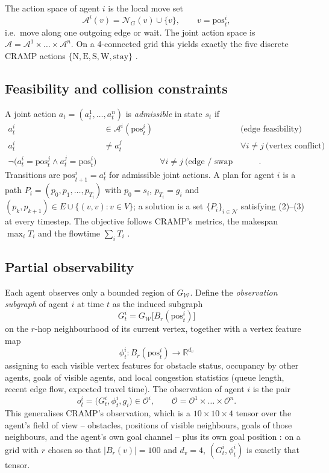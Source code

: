 \documentclass[../main.tex]{subfiles}
\begin{document}
The action space of agent $i$ is the local move set
\[
  \mathcal{A}^i(v) = \mathcal{N}_G(v) \cup \{v\}, \qquad v = \mathrm{pos}^i_t ,
\]
i.e.\ move along one outgoing edge or wait. The joint action space is
$\mathcal{A} = \mathcal{A}^1 \times \dots \times \mathcal{A}^n$.
On a 4-connected grid this yields exactly the five discrete CRAMP actions
$\{\mathrm{N}, \mathrm{E}, \mathrm{S}, \mathrm{W}, \mathrm{stay}\}$
\cite{cramp}.

\subsection{Feasibility and collision constraints}
A joint action $a_t = (a^1_t, \dots, a^n_t)$ is \emph{admissible} in state $s_t$ if
\begin{align}
  a^i_t &\in \mathcal{A}^i(\mathrm{pos}^i_t) && \text{(edge feasibility)} \\
  a^i_t &\neq a^j_t && \forall i \neq j \ \text{(vertex conflict)} \\
  \neg \bigl( a^i_t = \mathrm{pos}^j_t \wedge a^j_t = \mathrm{pos}^i_t \bigr)
        && \forall i \neq j \ \text{(edge / swap conflict)} .
\end{align}
Transitions are $\mathrm{pos}^i_{t+1} = a^i_t$ for admissible joint actions.
A plan for agent $i$ is a path
$P_i = (p_0, p_1, \dots, p_{T_i})$ with $p_0 = s_i$, $p_{T_i} = g_i$ and
$(p_k, p_{k+1}) \in E \cup \{(v,v) : v \in V\}$; a solution is a set
$\{P_i\}_{i \in \mathcal{N}}$ satisfying (2)--(3) at every timestep.
The objective follows CRAMP's metrics, the makespan
$\max_{i} T_i$ and the flowtime $\sum_i T_i$ \cite{cramp}.

\subsection{Partial observability}
Each agent observes only a bounded region of $G_{\mathcal{W}}$. Define the
\emph{observation subgraph} of agent $i$ at time $t$ as the induced subgraph
\[
  G^i_t = G_{\mathcal{W}}\bigl[ B_r(\mathrm{pos}^i_t) \bigr]
\]
on the $r$-hop neighbourhood of its current vertex, together with a vertex
feature map
\[
  \phi^i_t : B_r(\mathrm{pos}^i_t) \to \mathbb{R}^{d_v}
\]
assigning to each visible vertex features for obstacle status, occupancy by
other agents, goals of visible agents, and local congestion statistics
(queue length, recent edge flow, expected travel time). The observation of
agent $i$ is the pair
\[
  o^i_t = \bigl( G^i_t, \phi^i_t, g_i \bigr) \in \mathcal{O}^i ,
  \qquad
  \mathcal{O} = \mathcal{O}^1 \times \dots \times \mathcal{O}^n .
\]
This generalises CRAMP's observation, which is a
$10 \times 10 \times 4$ tensor over the agent's field of view --
obstacles, positions of visible neighbours, goals of those neighbours, and the
agent's own goal channel -- plus its own goal position \cite{cramp}:
on a grid with $r$ chosen so that $|B_r(v)| = 100$ and $d_v = 4$,
$(G^i_t, \phi^i_t)$ is exactly that tensor.
\end{document}

